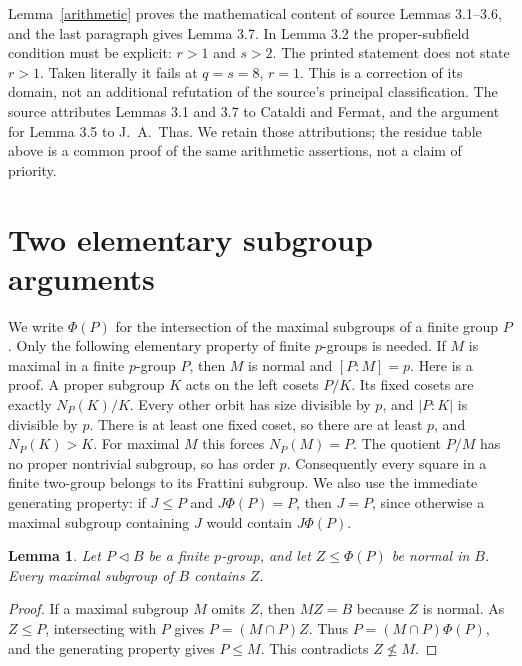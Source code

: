 \documentclass[11pt,a4paper]{article}
\newtheorem{lemma}[theorem]{Lemma}
\begin{document}
Lemma~\ref{arithmetic} proves the mathematical content of source
Lemmas 3.1--3.6, and the last paragraph gives Lemma 3.7. In Lemma
3.2 the proper-subfield condition must be explicit: $r>1$ and $s>2$.
The printed statement does not state $r>1$. Taken literally it fails
at $q=s=8$, $r=1$. This is a correction of its domain, not an
additional refutation of the source's principal classification.
The source attributes Lemmas 3.1 and 3.7 to Cataldi and Fermat,
and the argument for Lemma 3.5 to J.~A.~Thas. We retain those
attributions; the residue table above is a common proof of the same
arithmetic assertions, not a claim of priority.

\section{Two elementary subgroup arguments}
We write $\Phi(P)$ for the intersection of the maximal subgroups of
a finite group $P$. Only the following elementary property of finite
$p$-groups is needed. If $M$ is maximal in a finite $p$-group $P$,
then $M$ is normal and $[P:M]=p$. Here is a proof. A proper subgroup
$K$ acts on the left cosets $P/K$. Its fixed cosets are exactly
$N_P(K)/K$. Every other orbit has size divisible by $p$, and
$|P:K|$ is divisible by $p$. There is at least one fixed coset,
so there are at least $p$, and $N_P(K)>K$. For maximal $M$ this
forces $N_P(M)=P$. The quotient $P/M$ has no proper nontrivial
subgroup, so has order $p$.
Consequently every square in a finite two-group belongs to its
Frattini subgroup. We also use the immediate generating property:
if $J\le P$ and $J\Phi(P)=P$, then $J=P$, since otherwise a
maximal subgroup containing $J$ would contain $J\Phi(P)$.

\begin{lemma}\label{frattini}
Let $P\lhd B$ be a finite $p$-group, and let $Z\le\Phi(P)$ be
normal in $B$. Every maximal subgroup of $B$ contains $Z$.
\end{lemma}
\begin{proof}
If a maximal subgroup $M$ omits $Z$, then $MZ=B$ because $Z$ is
normal. As $Z\le P$, intersecting with $P$ gives
$P=(M\cap P)Z$. Thus $P=(M\cap P)\Phi(P)$, and the generating
property gives $P\le M$. This contradicts $Z\nleq M$.
\end{proof}
\end{document}
